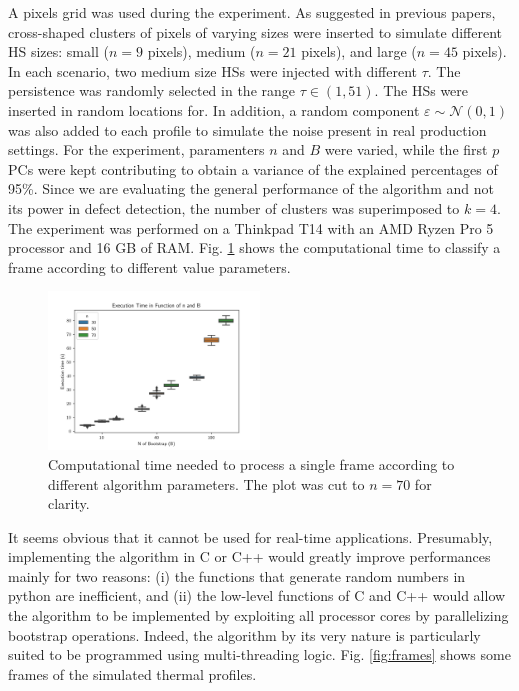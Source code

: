 A  pixels grid was used during the experiment. As suggested in previous papers, cross-shaped clusters of pixels of varying sizes were inserted to simulate different HS sizes: small ($n=9$ pixels), medium ($n=21$ pixels), and large ($n=45$ pixels). In each scenario, two medium size HSs were injected with different $\tau$. The persistence was randomly selected in the range $\tau\in (1,51)$. The HSs were inserted in random locations for. In addition, a random component $\varepsilon \sim \mathcal{N}(0, 1)$ was also added to each profile to simulate the noise present in real production settings.
For the experiment, paramenters $n$ and $B$ were varied, while the first $p$ PCs were kept contributing to obtain a variance of the explained percentages of 95\%. Since we are evaluating the general performance of the algorithm and not its power in defect detection, the number of clusters was superimposed to $k=4$. The experiment was performed on a Thinkpad T14 with an AMD Ryzen Pro 5 processor and 16 GB of RAM. Fig. \ref{fig:time} shows the computational time to classify a frame according to different value parameters.
\begin{figure}
    \centering
    \includegraphics[width = 0.5\textwidth]{Images/time.png}
    \caption[Computational time of BVC on simulated data.]{Computational time needed to process a single frame according to different algorithm parameters. The plot was cut to $n=70$ for clarity.}
    \label{fig:time}
\end{figure}
It seems obvious that it cannot be used for real-time applications. Presumably, implementing the algorithm in C or C++ would greatly improve performances mainly for two reasons: (i) the functions that generate random numbers in python are inefficient, and (ii) the low-level functions of C and C++ would allow the algorithm to be implemented by exploiting all processor cores by parallelizing bootstrap operations. Indeed, the algorithm by its very nature is particularly suited to be programmed using multi-threading logic. Fig. \ref{fig:frames} shows some frames of the simulated thermal profiles.
